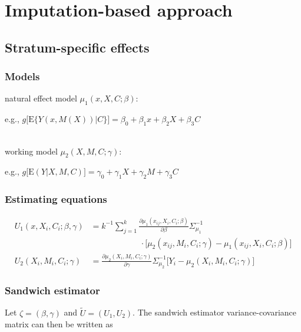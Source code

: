 \documentclass[]{article}
\begin{document}
\newpage
\section*{Imputation-based approach}

\subsection*{Stratum-specific effects}

\subsubsection*{Models}

natural effect model $\mu_1(x,X,C;\beta)$:
\begin{flushright} e.g., $g\big[\textrm{E}\{Y(x,M(X))\vert C\}\big] = \beta_0 + \beta_1 x + \beta_2 X + \beta_3 C$ \end{flushright}\\[1em]
working model $\mu_2(X,M,C;\gamma)$:
\begin{flushright} e.g., $g\big[\textrm{E}(Y\vert X,M,C)\big] = \gamma_0 + \gamma_1 X + \gamma_2 M + \gamma_3 C$ \end{flushright}

\subsubsection*{Estimating equations}

\begin{align*}
\displaystyle U_{1}(x,X_i,C_i;\beta,\gamma) &= k^{-1} \sum_{j=1}^{k} \frac{\partial \mu_1(x_{ij},X_i,C_i;\beta)}{\partial \beta} \Sigma_{\mu_1}^{-1}\\[-0.6em] & \qquad \qquad \qquad \cdot \big[ \mu_2(x_{ij},M_i,C_i;\gamma) - \mu_1(x_{ij},X_i,C_i;\beta) \big]\\[1em]
\displaystyle U_{2}(X_i,M_i,C_i;\gamma) &= \frac{\partial \mu_2(X_i,M_i,C_i;\gamma)}{\partial \gamma} \Sigma_{\mu_2}^{-1} \big[ Y_i - \mu_2(X_i,M_i,C_i;\gamma) \big]
\end{align*}

\subsubsection*{Sandwich estimator}

Let $\zeta = (\beta, \gamma)$ and $\tilde U = (U_1, U_2)$. The sandwich estimator variance-covariance matrix can then be written as
\end{document}
